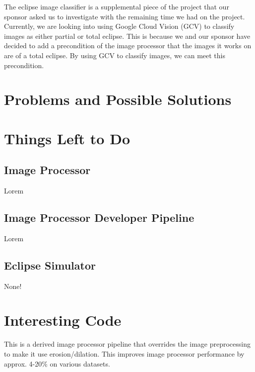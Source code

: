 \documentclass[10pt, onecolumn, draftclsnofoot, letterpaper, compsoc]{IEEEtran}
\begin{document}
The eclipse image classifier is a supplemental piece of the project that our
sponsor asked us to investigate with the remaining time we had on the project.
Currently, we are looking into using Google Cloud Vision (GCV) to classify images
as either partial or total eclipse. This is because we and our sponsor have
decided to add a precondition of the image processor that the images it works
on are of a total eclipse. By using GCV to classify images, we can meet this
precondition. \\

\section{Problems and Possible Solutions}


\section{Things Left to Do}

\subsection{Image Processor}

Lorem \\

\subsection{Image Processor Developer Pipeline}

Lorem \\

\subsection{Eclipse Simulator}

None! \\


\newpage
\section{Interesting Code}

This is a derived image processor pipeline that overrides the image preprocessing
to make it use erosion/dilation. This improves image processor performance by approx. 4-20\%
on various datasets. \\
\end{document}
